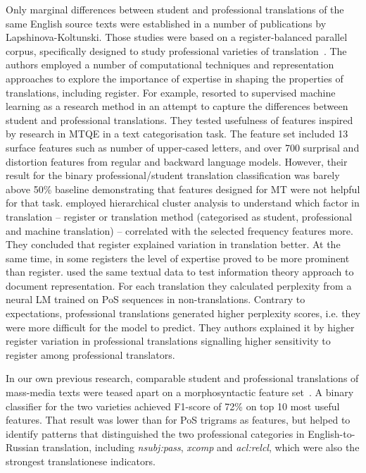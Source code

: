 Only marginal differences between student and professional translations of the same English source texts were established in a number of publications by Lapshinova-Koltunski. Those studies were based on a register-balanced parallel corpus, specifically designed to study professional varieties of translation~\cite{Lapshinova2013}. The authors employed a number of computational techniques and representation approaches to explore the importance of expertise in shaping the properties of translations, including register. 
For example, \citet{Rubino2016} resorted to supervised machine learning as a research method in an attempt to capture the differences between student and professional translations. They tested usefulness of features inspired by research in \gls{MTQE} in a text categorisation task. The feature set included 13 surface features such as number of upper-cased letters, and over 700 surprisal and distortion features from regular and backward language models. However, their result for the binary professional/student translation classification was barely above 50\% baseline demonstrating that features designed for MT were not helpful for that task. 
\citet{Lapshinova2017} employed hierarchical cluster analysis to understand which factor in translation -- register or translation method (categorised as student, professional and machine translation) -- correlated with the selected frequency features more. They concluded that register explained variation in translation better. At the same time, in some registers the level of expertise proved to be more prominent than register. 
\citet{Bizzoni2021} used the same textual data to test information theory approach to document representation. For each translation they calculated perplexity from a neural LM trained on PoS sequences in non-translations. Contrary to expectations, professional translations generated higher perplexity scores, i.e. they were more difficult for the model to predict. They authors explained it by higher register variation in professional translations signalling higher sensitivity to register among professional translators. 

In our own previous research, comparable student and professional translations of mass-media texts were teased apart on a morphosyntactic feature set~\cite{Kunilovskaya2018ud}. A binary classifier for the two varieties achieved F1-score of 72\% on top 10 most useful features. That result was lower than for PoS trigrams as features, but helped to identify patterns that distinguished the two professional categories in English-to-Russian translation, including \textit{nsubj:pass}, \textit{xcomp} and \textit{acl:relcl}, which were also the strongest translationese indicators.

